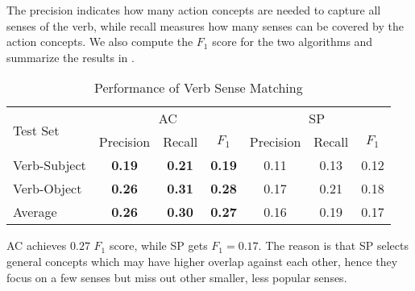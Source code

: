 The precision indicates how many action concepts are needed to
capture all senses of the verb, while recall measures how many
senses can be covered by the action concepts.
We also compute the $F_1$ score for the two algorithms and summarize the results
in .
\begin{table}[th]
\centering
\caption{Performance of Verb Sense Matching}
\begin{tabular}{|l|c|c|c|c|c|c|}
\hline
\multirow{2}{*}{Test Set} & \multicolumn{3}{c|}{AC} & \multicolumn{3}{c|}{SP}\\
\cline{2-7}
& Precision & Recall & $F_1$ & Precision & Recall & $F_1$\\
\hline
Verb-Subject &\bf 0.19 &\bf 0.21 &\bf 0.19 & 0.11 & 0.13 & 0.12\\
\hline
Verb-Object &\bf 0.26 &\bf 0.31 &\bf 0.28 & 0.17 & 0.21 & 0.18\\
\hline
Average &\bf 0.26 &\bf 0.30 &\bf 0.27 & 0.16 & 0.19 & 0.17\\
\hline
\end{tabular}
\label{tab:verbmatch}
\end{table}

AC achieves $0.27$ $F_1$ score, while SP gets $F_1=0.17$.
The reason is that SP selects general
concepts which may have higher overlap against each other,
hence they focus on a few senses but miss out other smaller, less
popular senses.
